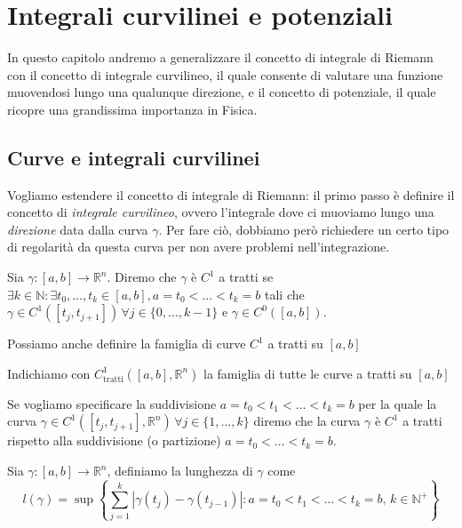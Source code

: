 \chapter{Integrali curvilinei e potenziali}

In questo capitolo andremo a generalizzare il concetto di integrale di Riemann con il concetto di integrale curvilineo, il quale consente di valutare una funzione muovendosi lungo una qualunque direzione, e il concetto di potenziale, il quale ricopre una grandissima importanza in Fisica.

\section{Curve e integrali curvilinei}

Vogliamo estendere il concetto di integrale di Riemann: il primo passo è definire il concetto di \emph{integrale curvilineo}, ovvero l'integrale dove ci muoviamo lungo una \emph{direzione} data dalla curva $\gamma$. Per fare ciò, dobbiamo però richiedere un certo tipo di regolarità da questa curva per non avere problemi nell'integrazione.
\begin{definition}
	Sia $\gamma: [a, b] \to \mathbb{R}^n$. Diremo che $\gamma$ è $C^1$ a tratti se $\exists k \in \mathbb{N} : \exists t_0, \ldots, t_k \in [a, b], a = t_0 < \ldots < t_k = b$ tali che $\gamma \in C^1([t_{j}, t_{j+1}]) \, \forall j \in \{0, \ldots, k-1 \}$ e $\gamma \in C^0([a, b])$.
\end{definition}
Possiamo anche definire la famiglia di curve $C^1$ a tratti su $[a,b]$
\begin{definition}
	Indichiamo con $C^1_{\text{tratti}}([a, b], \mathbb{R}^n)$ la famiglia di tutte le curve a tratti su $[a, b]$
\end{definition}
Se vogliamo specificare la suddivisione $a=t_0 < t_1 < \ldots < t_k = b$ per la quale la curva $\gamma \in C^1([t_j, t_{j+1}], \mathbb{R}^n) \, \forall j \in \{1, \ldots, k \}$ 
diremo che la curva $\gamma$ è $C^1$ a tratti rispetto alla suddivisione (o partizione) $a = t_0 < \ldots < t_k = b$. \\
\begin{definition} 
	Sia $\gamma : [a,b] \to \mathbb{R}^n$, definiamo la lunghezza di $\gamma$ come
	$$
		\mathit{l}(\gamma) = \sup \left\{ \sum_{j=1}^k |\gamma(t_j)-\gamma(t_{j-1})| : a = t_0 < t_1 < \ldots < t_k = b, \, k \in \mathbb{N}^+ \right\}
	$$
\end{definition}
